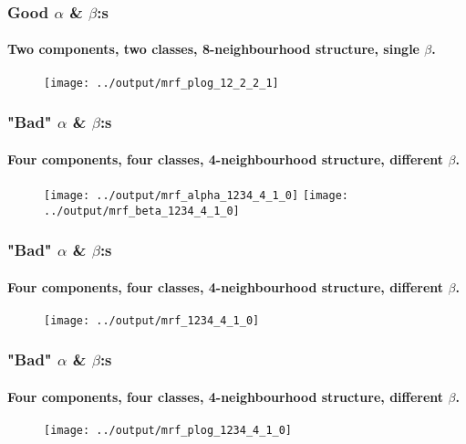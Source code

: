 \documentclass[12pt, english]{beamer}
\begin{document}
\begin{frame}
  \frametitle{Good $\alpha$ \& $\beta$:s}
  \framesubtitle{Two components, two classes, 8-neighbourhood structure, single $\beta$.}

\begin{figure}
\centering
\texttt{[image: ../output/mrf\_plog\_12\_2\_2\_1]}
    \caption*{}
    \label{fig:plog}  
\end{figure}
\end{frame}



\begin{frame}
  \frametitle{"Bad" $\alpha$ \& $\beta$:s}
  \framesubtitle{Four components, four classes, 4-neighbourhood structure, different $\beta$.}

\begin{figure}
\centering
\texttt{[image: ../output/mrf\_alpha\_1234\_4\_1\_0]}
\texttt{[image: ../output/mrf\_beta\_1234\_4\_1\_0]}
    \caption*{}
    \label{fig:alphabeta}  
\end{figure}
\end{frame}

\begin{frame}
  \frametitle{"Bad" $\alpha$ \& $\beta$:s}
  \framesubtitle{Four components, four classes, 4-neighbourhood structure, different $\beta$.}

\begin{figure}
\centering
\texttt{[image: ../output/mrf\_1234\_4\_1\_0]}
    \caption*{}
    \label{fig:mrf}  
\end{figure}
\end{frame}

\begin{frame}
  \frametitle{"Bad" $\alpha$ \& $\beta$:s}
  \framesubtitle{Four components, four classes, 4-neighbourhood structure, different $\beta$.}

\begin{figure}
\centering
\texttt{[image: ../output/mrf\_plog\_1234\_4\_1\_0]}
    \caption*{}
    \label{fig:mrf}  
\end{figure}
\end{frame}



\end{document}
